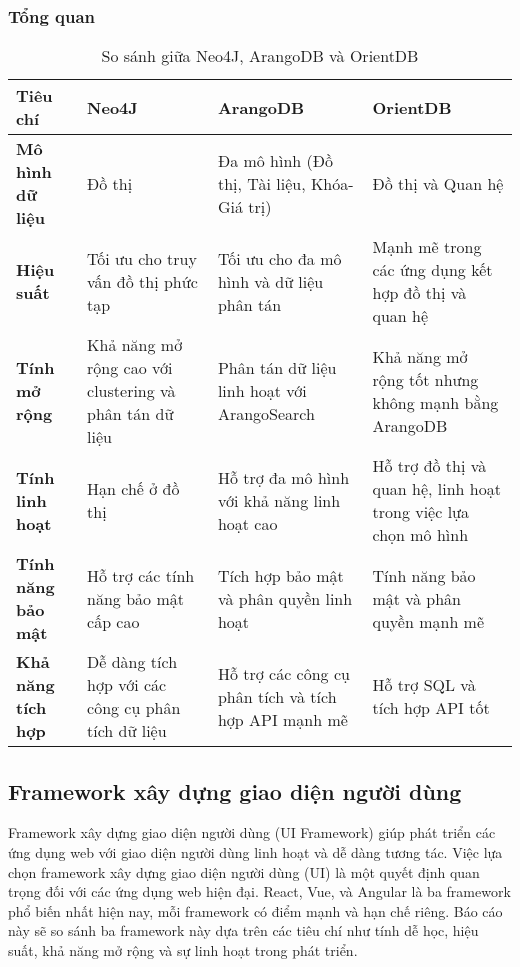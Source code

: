 \subsubsection{Tổng quan}
\begin{table}[H]
    \centering
    \begin{tabular}{|p{2.5cm}|p{4.5cm}|p{4.5cm}|p{4.5cm}|}
    \hline
    \textbf{Tiêu chí} & \textbf{Neo4J} & \textbf{ArangoDB} & \textbf{OrientDB} \\ 
    \hline
    \textbf{Mô hình dữ liệu} & Đồ thị & Đa mô hình (Đồ thị, Tài liệu, Khóa-Giá trị) & Đồ thị và Quan hệ \\
    \hline
    \textbf{Hiệu suất} & Tối ưu cho truy vấn đồ thị phức tạp & Tối ưu cho đa mô hình và dữ liệu phân tán & Mạnh mẽ trong các ứng dụng kết hợp đồ thị và quan hệ \\
    \hline
    \textbf{Tính mở rộng} & Khả năng mở rộng cao với clustering và phân tán dữ liệu & Phân tán dữ liệu linh hoạt với ArangoSearch & Khả năng mở rộng tốt nhưng không mạnh bằng ArangoDB \\
    \hline
    \textbf{Tính linh hoạt} & Hạn chế ở đồ thị & Hỗ trợ đa mô hình với khả năng linh hoạt cao & Hỗ trợ đồ thị và quan hệ, linh hoạt trong việc lựa chọn mô hình \\
    \hline
    \textbf{Tính năng bảo mật} & Hỗ trợ các tính năng bảo mật cấp cao & Tích hợp bảo mật và phân quyền linh hoạt & Tính năng bảo mật và phân quyền mạnh mẽ \\
    \hline
    \textbf{Khả năng tích hợp} & Dễ dàng tích hợp với các công cụ phân tích dữ liệu & Hỗ trợ các công cụ phân tích và tích hợp API mạnh mẽ & Hỗ trợ SQL và tích hợp API tốt \\
    \hline
    \end{tabular}
    \caption{So sánh giữa Neo4J, ArangoDB và OrientDB}
\end{table}
\subsection{Framework xây dựng giao diện người dùng}

Framework xây dựng giao diện người dùng (UI Framework) giúp phát triển các ứng dụng web với giao diện người dùng linh hoạt và dễ dàng tương tác. Việc lựa chọn framework xây dựng giao diện người dùng (UI) là một quyết định quan trọng đối với các ứng dụng web hiện đại. React, Vue, và Angular là ba framework phổ biến nhất hiện nay, mỗi framework có điểm mạnh và hạn chế riêng. Báo cáo này sẽ so sánh ba framework này dựa trên các tiêu chí như tính dễ học, hiệu suất, khả năng mở rộng và sự linh hoạt trong phát triển.


